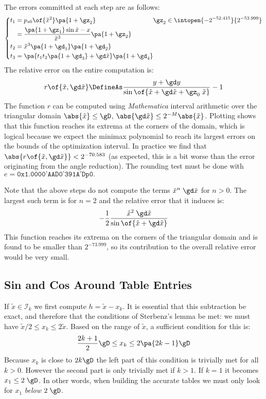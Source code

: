 \documentclass[10pt, a4paper, twoside]{basestyle}
\newcommand{\red}[1]{\tilde{#1}}
\begin{document}
The errors committed at each step are as follows:
\[
\left\{
\begin{alignedat}{3}
t_1 &= p_{s0}\of{{\red x}^2} \pa{1 + \gz_2} &\gz_2 &\in \intopen{-2^{-52.415}}{2^{-53.999}} \\
&= \frac{\pa{1 + \gz_1} \sin {\red x} - x}{{\red x^3}} \pa{1 + \gz_2} \\
t_2 &= {\red x}^3 \pa{1 + \gd_1} \pa{1 + \gd_2} \\
t_3 &= \pa{t_1 t_2 \pa{1 + \gd_3} + \gd \red x} \pa{1 + \gd_4}
\end{alignedat}
\right.
\]
The relative error on the entire computation is:
\[
r\of{\red x, \gd \red x} \DefineAs \frac{y + \gd y}{\sin\of{\red x + \gd \red x + \gz_0 \; \red x}} - 1
\]
The function $r$ can be computed using \textit{Mathematica} interval arithmetic over the triangular domain $\abs{\red x} \le \gD$, $\abs{\gd \red x} \le 2^{-M} \abs{\red x}$.  Plotting shows that this function reaches its extrema at the corners of the domain, which is logical because we expect the minimax polynomial to reach its largest errors on the bounds of the optimization interval.  In practice we find that $\abs{r\of{\red x, \gd \red x}} < 2^{-70.583}$ (as expected, this is a bit worse than the error originating from the angle reduction).  The rounding test must be done with $e = \texttt{0x1.0000'AAD0'391A'Dp0}.$

Note that the above steps do not compute the terms ${\red x}^n \; \gd \red x$ for $n > 0$.  The largest such term is for $n = 2$ and the relative error that it induces is:
\[
-\frac{1}{2} \frac{{\red x}^2 \; \gd \red x}{\sin\of{\red x + \gd \red x}}
\]
This function reaches its extrema on the corners of the triangular domain and is found to be smaller than $2^{-73.999}$, so its contribution to the overall relative error would be very small.

\subsection*{Sin and Cos Around Table Entries}

If $\red x \in \mathscr{I}_k$ we first compute $h = \red x - x_k$.  It is essential that this subtraction be exact, and therefore that the conditions of Sterbenz's lemma be met: we must have $\red x / 2 \le x_k \le 2 \red x$.  Based on the range of $\red x$, a sufficient condition for this is:
\[
\frac{2 k + 1}{2} \gD \le x_k \le 2 \pa{2 k - 1} \gD
\]
Because $x_k$ is close to $2 k \gD$ the left part of this condition is trivially met for all $k > 0$.  However the second part is only trivially met if $k > 1$.  If $k = 1$ it becomes $x_1 \le 2 \; \gD$.  In other words, when building the accurate tables we must only look for $x_1$ \emph{below} $2 \; \gD$.
\end{document}
